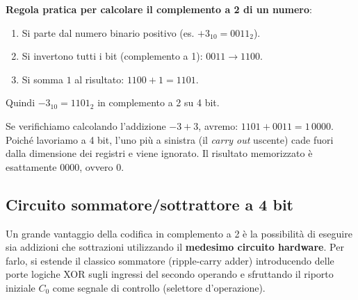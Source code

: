 \noindent\textbf{Regola pratica per calcolare il complemento a 2 di un numero}:
\begin{enumerate}
    \item Si parte dal numero binario positivo (es. $+3_{10} = 0011_2$).
    \item Si invertono tutti i bit (complemento a 1): $0011 \to 1100$.
    \item Si somma $1$ al risultato: $1100 + 1 = 1101$. 
\end{enumerate}
Quindi $-3_{10} = 1101_2$ in complemento a 2 su 4 bit.

\medskip
Se verifichiamo calcolando l'addizione $-3 + 3$, avremo: $1101 + 0011 = 1\,0000$. Poiché lavoriamo a 4 bit, l'uno più a sinistra (il \emph{carry out} uscente) cade fuori dalla dimensione dei registri e viene ignorato. Il risultato memorizzato è esattamente $0000$, ovvero 0.

\subsection{Circuito sommatore/sottrattore a 4 bit}

Un grande vantaggio della codifica in complemento a 2 è la possibilità di eseguire sia addizioni che sottrazioni utilizzando il \textbf{medesimo circuito hardware}. Per farlo, si estende il classico sommatore (ripple-carry adder) introducendo delle porte logiche XOR sugli ingressi del secondo operando e sfruttando il riporto iniziale $C_0$ come segnale di controllo (selettore d'operazione).

